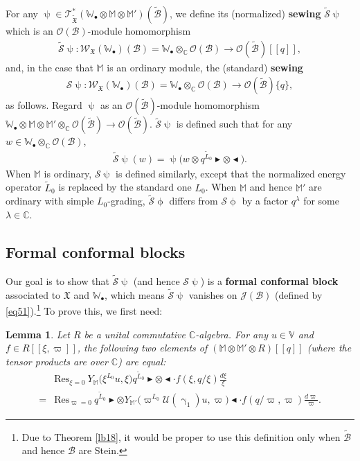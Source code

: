 \documentclass[12pt,a4paper,notitlepage]{article}
\theoremstyle{definition}
\theoremstyle{plain}
\newtheorem{lm}[df]{Lemma}
\newcommand{\fk}{\mathfrak}
\newcommand{\mc}{\mathcal}
\newcommand{\wtd}{\widetilde}
\newcommand{\Res}{\mathrm{Res}}
\newcommand{\scr}{\mathscr}
\newcommand{\blt}{\bullet}
\newcommand{\Vbb}{\mathbb V}
\newcommand{\Wbb}{\mathbb W}
\newcommand{\Mbb}{\mathbb M}
\newcommand{\Cbb}{\mathbb C}
\newcommand{\btl}{\blacktriangleleft}
\newcommand{\btr}{\blacktriangleright}
\numberwithin{equation}{section}
\begin{document}
For any $\uppsi\in\scr T_{\wtd{\fk X}}^*(\Wbb_\blt\otimes\Mbb\otimes\Mbb')(\wtd{\mc B})$, we define its (normalized) \textbf{sewing} $\wtd{\mc S}\uppsi$ which is an $\scr O(\mc B)$-module homomorphism \index{S@$\wtd{\mc S}\uppsi,\mc S\uppsi$}
\begin{align*}
\wtd{\mc S}\uppsi:\scr W_{\fk X}(\Wbb_\blt)(\mc B)=\Wbb_\blt\otimes_\Cbb\scr O(\mc B)\rightarrow\scr O(\wtd{\mc B})[[q]],
\end{align*}
and, in the case that $\Mbb$ is an ordinary module, the (standard) \textbf{sewing}
\begin{align*}
\mc S\uppsi:\scr W_{\fk X}(\Wbb_\blt)(\mc B)=\Wbb_\blt\otimes_\Cbb\scr O(\mc B)\rightarrow\scr O(\wtd{\mc B})\{q\},
\end{align*}
as follows. Regard $\uppsi$ as an $\scr O(\wtd{\mc B})$-module homomorphism $\Wbb_\blt\otimes\Mbb\otimes\Mbb'\otimes_\Cbb\scr O(\wtd{\mc B})\rightarrow \scr O(\wtd{\mc B})$. $\wtd{\mc S}\uppsi$ is defined such that for any  $w\in\Wbb_\blt\otimes_\Cbb\scr O(\mc B)$,
\begin{align}
\wtd{\mc S}\uppsi(w)=\uppsi\big(w\otimes q^{\wtd L_0}\btr\otimes\btl\big).
\end{align}
When $\Mbb$ is ordinary, $\mc S\uppsi$ is defined similarly, except that the normalized energy operator $\wtd L_0$ is replaced by the standard one $L_0$. When $\Mbb$ and hence $\Mbb'$ are ordinary with simple $L_0$-grading, $\wtd{\mc S}\upphi$ differs from $\mc S\upphi$ by a factor $q^\lambda$ for some $\lambda\in\Cbb$. 


\subsection*{Formal conformal blocks}

Our goal is to show that $\wtd{\mc S}\uppsi$ (and hence $\mc S\uppsi$) is a \textbf{formal conformal block} associated to $\fk X$ and $\Wbb_\blt$, which means $\wtd{\mc S}\uppsi$ vanishes on $\scr J(\mc B)$ (defined by \eqref{eq51}).\footnote{Due to Theorem \ref{lb18}, it would be proper to use this definition only when $\wtd{\mc B}$ and hence $\mc B$ are Stein.} To prove this, we first need:

\begin{lm}\label{lb32}
	Let $R$ be a unital commutative $\Cbb$-algebra.  For any $u\in\Vbb$ and $f\in R[[\xi,\varpi]]$, the following two elements of $(\Mbb\otimes\Mbb'\otimes R)[[q]]$ (where the tensor products are over $\Cbb$) are equal:
	\begin{align}
	&\Res_{\xi=0}~Y_{\Mbb}\big(\xi^{L_0}u,\xi\big)q^{\wtd L_0}\btr\otimes\btl\cdot f(\xi,q/\xi)\frac{d\xi}{\xi}\nonumber\\
	=&\Res_{\varpi=0}~q^{\wtd L_0}\btr\otimes Y_{\Mbb'}\big(\varpi^{L_0}\mc U(\upgamma_1)u,\varpi\big)\btl\cdot f(q/\varpi,\varpi)\frac{d\varpi}{\varpi}.\label{eq60}
	\end{align}
\end{lm}
\end{document}
